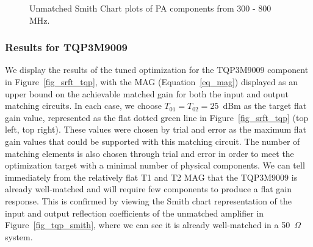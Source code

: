 	\begin{figure}[th]
\centering        
\caption{Unmatched Smith Chart plots of PA components from 300 - 800 MHz.\label{fig_smith_charts}}
\end{figure}
	
\subsubsection{Results for TQP3M9009}

	We display the results of the tuned optimization for the TQP3M9009 component in Figure~\ref{fig_srft_tqp}, with the \ac{MAG} (Equation~\ref{eq_mag}) displayed as an upper bound on the achievable matched gain for both the input and output matching circuits.
	In each case, we choose $T_{01} = T_{02} = 25$~dBm as the target flat gain value, represented as the flat dotted green line in Figure~\ref{fig_srft_tqp} (top left, top right).
	These values were chosen by trial and error as the maximum flat gain values that could be supported with this matching circuit.
		The number of matching elements is also chosen through trial and error in order to meet the optimization target with a minimal number of physical components.
		We can tell immediately from the relatively flat T1 and T2 \ac{MAG} that the TQP3M9009 is already well-matched and will require few components to produce a flat gain response.
		This is confirmed by viewing the Smith chart representation \cite{orfanidis2002electromagnetic} of the input and output reflection coefficients of the unmatched amplifier in Figure~\ref{fig_tqp_smith}, where we can see it is already well-matched in a 50~$\Omega$ system. 

